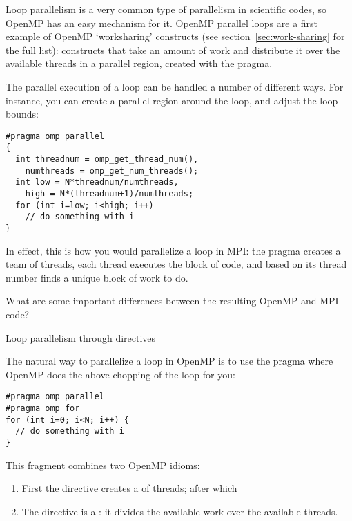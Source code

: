 
Loop parallelism is a very common type of parallelism in scientific
codes, so OpenMP has an easy mechanism for it.
OpenMP parallel loops are a first example of OpenMP `worksharing'
constructs (see section~\ref{sec:work-sharing} for the full list):
constructs that take an amount of work and distribute it over the
available threads in a parallel region,
created with the  pragma.

The parallel execution of a loop can be handled a number of different ways.
For instance, you can create a parallel region around the loop, and
adjust the loop bounds:
\begin{lstlisting}[language=omp]
#pragma omp parallel
{
  int threadnum = omp_get_thread_num(),
    numthreads = omp_get_num_threads();
  int low = N*threadnum/numthreads,
    high = N*(threadnum+1)/numthreads;
  for (int i=low; i<high; i++)
    // do something with i
}
\end{lstlisting}
In effect, this is how you would parallelize a loop in MPI:
the  pragma creates a team of threads,
each thread executes the block of code,
and based on its thread number finds a unique block of work to do.

\begin{exercise}
  What are some important differences between the resulting OpenMP and MPI code?
\end{exercise}

 {Loop parallelism through directives}
\label{sec:omp-for}

The natural way to parallelize a loop in OpenMP
is to use the
 pragma
where OpenMP does the above chopping of the loop
for you:
\begin{lstlisting}[language=omp]
#pragma omp parallel
#pragma omp for
for (int i=0; i<N; i++) {
  // do something with i
}
\end{lstlisting}

This fragment combines two OpenMP idioms:
\begin{enumerate}
\item First the  directive
  creates a  of threads; after which
\item The  directive is a
  :
  it divides the available work over the available threads.
\end{enumerate}

